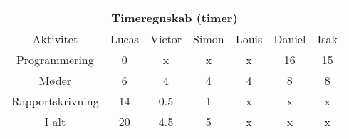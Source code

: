 \centering
\begin{tabular}{ |c|c|c|c|c|c|c|  }
 \hline
 \multicolumn{7}{|c|}{Timeregnskab (timer)} \\
 \hline
 Aktivitet & Lucas & Victor & Simon & Louis & Daniel & Isak\\
 \hline
 
 
 Programmering      & 0 & x & x & x & 16 & 15 \\
 
 Møder              & 6 & 4 & 4 & 4 & 8 & 8 \\
 
 Rapportskrivning   & 14 & 0.5 & 1 & x & x & x \\
 
 \hline
 
 I alt              & 20 & 4.5 & 5 & x & x & x \\
 
 
 \hline
\end{tabular}